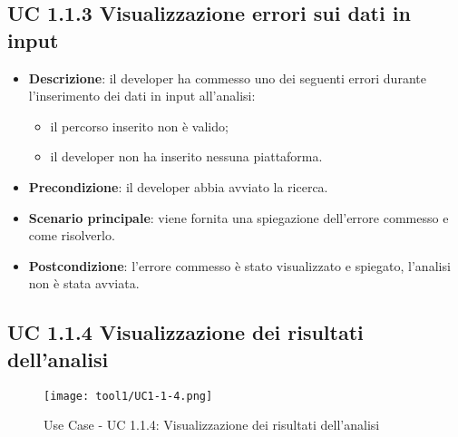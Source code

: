	\subsection{UC 1.1.3 Visualizzazione errori sui dati in input}
		\label{subsec:UC1.1.3}
	
		\begin{itemize}
			\item\textbf{Descrizione}: il developer ha commesso uno dei seguenti errori durante l'inserimento dei dati in input all'analisi:
			\begin{itemize}
				\item il percorso inserito non è valido;
				\item il developer non ha inserito nessuna piattaforma.
			\end{itemize}
			\item\textbf{Precondizione}: il developer abbia avviato la ricerca.
			\item\textbf{Scenario principale}: viene fornita una spiegazione dell'errore commesso e come risolverlo.
			\item\textbf{Postcondizione}: l'errore commesso è stato visualizzato e spiegato, l'analisi non è stata avviata.
		\end{itemize}

	\subsection{UC 1.1.4 Visualizzazione dei risultati dell'analisi}
		\label{subsec:UC1.1.4}
		
		\begin{figure}[!h] 
			\centering 
			\texttt{[image: tool1/UC1-1-4.png]} 
			\caption{Use Case - UC 1.1.4: Visualizzazione dei risultati dell'analisi}
		\end{figure}
		
